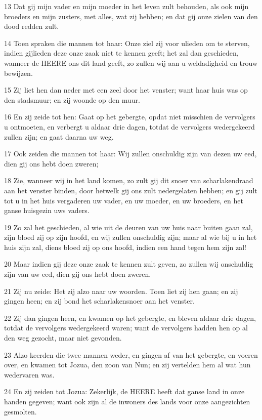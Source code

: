 \par 13 Dat gij mijn vader en mijn moeder in het leven zult behouden, als ook mijn broeders en mijn zusters, met alles, wat zij hebben; en dat gij onze zielen van den dood redden zult.
\par 14 Toen spraken die mannen tot haar: Onze ziel zij voor ulieden om te sterven, indien gijlieden deze onze zaak niet te kennen geeft; het zal dan geschieden, wanneer de HEERE ons dit land geeft, zo zullen wij aan u weldadigheid en trouw bewijzen.
\par 15 Zij liet hen dan neder met een zeel door het venster; want haar huis was op den stadsmuur; en zij woonde op den muur.
\par 16 En zij zeide tot hen: Gaat op het gebergte, opdat niet misschien de vervolgers u ontmoeten, en verbergt u aldaar drie dagen, totdat de vervolgers wedergekeerd zullen zijn; en gaat daarna uw weg.
\par 17 Ook zeiden die mannen tot haar: Wij zullen onschuldig zijn van dezen uw eed, dien gij ons hebt doen zweren;
\par 18 Zie, wanneer wij in het land komen, zo zult gij dit snoer van scharlakendraad aan het venster binden, door hetwelk gij ons zult nedergelaten hebben; en gij zult tot u in het huis vergaderen uw vader, en uw moeder, en uw broeders, en het ganse huisgezin uws vaders.
\par 19 Zo zal het geschieden, al wie uit de deuren van uw huis naar buiten gaan zal, zijn bloed zij op zijn hoofd, en wij zullen onschuldig zijn; maar al wie bij u in het huis zijn zal, diens bloed zij op ons hoofd, indien een hand tegen hem zijn zal!
\par 20 Maar indien gij deze onze zaak te kennen zult geven, zo zullen wij onschuldig zijn van uw eed, dien gij ons hebt doen zweren.
\par 21 Zij nu zeide: Het zij alzo naar uw woorden. Toen liet zij hen gaan; en zij gingen heen; en zij bond het scharlakensnoer aan het venster.
\par 22 Zij dan gingen heen, en kwamen op het gebergte, en bleven aldaar drie dagen, totdat de vervolgers wedergekeerd waren; want de vervolgers hadden hen op al den weg gezocht, maar niet gevonden.
\par 23 Alzo keerden die twee mannen weder, en gingen af van het gebergte, en voeren over, en kwamen tot Jozua, den zoon van Nun; en zij vertelden hem al wat hun wedervaren was.
\par 24 En zij zeiden tot Jozua: Zekerlijk, de HEERE heeft dat ganse land in onze handen gegeven; want ook zijn al de inwoners des lands voor onze aangezichten gesmolten.

